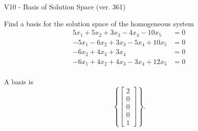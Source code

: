 \begin{exercise}
  \begin{exerciseTitle}V10 - Basis of Solution Space (ver. 361)\end{exerciseTitle}
  \begin{exerciseStatement}
    Find a basis for the solution space of the homogeneous system 
\begin{align*}
 5 x_ 1 + 5 x_ 2 + 3 x_ 3 -4 x_ 4 -10 x_ 5 &= 0  \\ 
  -5 x_ 1 -6 x_ 2 + 3 x_ 3 -5 x_ 4 + 10 x_ 5 &= 0  \\ 
  -6 x_ 2 + 4 x_ 3 + 3 x_ 4 &= 0  \\ 
  -6 x_ 1 + 4 x_ 2 + 4 x_ 3 -3 x_ 4 + 12 x_ 5 &= 0  \\ 
 \end{align*}


 
  \end{exerciseStatement}

  \begin{exerciseAnswer}
   A basis is   
\[\left\{\left[\begin{array}{c}
2 \\
0 \\
0 \\
0 \\
1
\end{array}\right]\right\}.\]

  


  \end{exerciseAnswer}
\end{exercise}